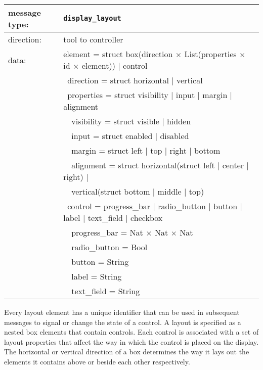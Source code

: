 \documentclass{article}
\newcommand{\msg}[1]{\texttt{#1}}
\begin{document}
   \begin{table}[H]
    \begin{center}
     \begin{tabular}{|ll|}
      \hline
       message type:   & \msg{display\_layout} \\
      \hline
       direction:      & tool to controller \\
       data:           & element = struct box(direction $\times$ List(properties $\times$ id $\times$ element)) $|$ control \\
                       & \ direction = struct horizontal $|$ vertical \\
                       & \ properties = struct visibility $|$ input $|$ margin $|$ alignment \\
                       & \ \ visibility = struct visible $|$ hidden \\
                       & \ \ input = struct enabled $|$ disabled \\
                       & \ \ margin = struct left $|$ top $|$ right $|$ bottom \\
                       & \ \ alignment = struct horizontal(struct left $|$ center $|$ right) $|$ \\
                       & \ \                    vertical(struct bottom $|$ middle $|$ top) \\
                       & \ control = progress\_bar $|$ radio\_button $|$ button $|$ label $|$ text\_field $|$ checkbox \\
                       & \ \ progress\_bar = Nat $\times$ Nat $\times$ Nat \\
                       & \ \ radio\_button = Bool \\
                       & \ \ button        = String \\
                       & \ \ label         = String \\
                       & \ \ text\_field   = String \\
      \hline
     \end{tabular}
    \end{center}
   \end{table}
   \vspace{-0.4cm}
   \noindent Every layout element has a unique identifier that can be used in
   subsequent messages to signal or change the state of a control. A layout is
   specified as a nested box elements that contain controls. Each control is
   associated with a set of layout properties that affect the way in which the
   control is placed on the display. The horizontal or vertical direction of a
   box determines the way it lays out the elements it contains above or beside
   each other respectively.
\end{document}
